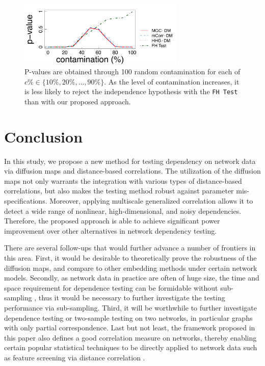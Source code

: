 \documentclass[11pt]{article}
\theoremstyle{definition}
\begin{document}
\begin{figure}[ht]
	\centering
	\includegraphics[width=0.7\textwidth]{../Figure/Elbow3_t3.pdf}
	\caption{P-values are obtained through 100 random contamination for each of $c\% \in \{ 10\%, 20\%, \ldots, 90\% \}$. As the level of contamination increases, it is less likely to reject the independence hypothesis with the \texttt{FH Test} than with our proposed approach.}
\label{fig:realexample}
\end{figure}

\section{Conclusion}
	\label{sec:conc}
	
	In this study, we propose a new method for testing dependency on network data via diffusion maps and distance-based correlations. The utilization of the diffusion maps not only warrants the integration with various types of distance-based correlations, but also makes the testing method robust against parameter mis-specifications. Moreover, applying multiscale generalized correlation allows it to detect a wide range of nonlinear, high-dimensional, and noisy dependencies. Therefore, the proposed approach is able to achieve significant power improvement over other alternatives in network dependency testing. 
    
  There are several follow-ups that would further advance a number of frontiers in this area. First, it would be desirable to theoretically prove the robustness of the diffusion maps, and compare to other embedding methods under certain network models. Secondly, as network data in practice are often of huge size, the time and space requirement for dependence testing can be formidable without sub-sampling \cite{zhang2017large}, thus it would be necessary to further investigate the testing performance via sub-sampling. Third, it will be worthwhile to further investigate dependence testing or two-sample testing on two networks, in particular graphs with only partial correspondence. Last but not least, the framework proposed in this paper also defines a good correlation measure on networks, thereby enabling certain popular statistical techniques to be directly applied to network data such as feature screening via distance correlation \cite{LiZhongZhu2012}.
\end{document}
